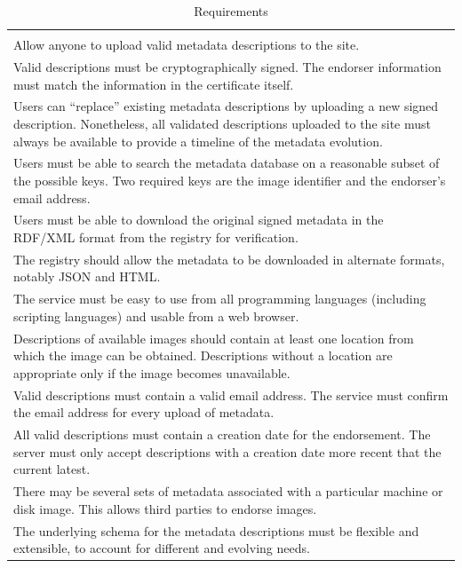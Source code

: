 \begin{table}
\caption{Requirements}
\label{tab:requirements}
\begin{center}
\begin{tabular}{p{}}
\hline\hline

\\ Allow anyone to upload valid metadata descriptions to the site.

\\ Valid descriptions must be cryptographically signed.  The endorser
information must match the information in the certificate itself.

\\ Users can ``replace'' existing metadata descriptions by
  uploading a new signed description.  Nonetheless, all validated
  descriptions uploaded to the site must always be available to
  provide a timeline of the metadata evolution.

\\ Users must be able to search the metadata database on a
  reasonable subset of the possible keys.  Two required keys are the
  image identifier and the endorser's email address.

\\ Users must be able to download the original signed metadata in
  the RDF/XML format from the registry for verification.

\\ The registry should allow the metadata to be downloaded in
  alternate formats, notably JSON and HTML.

\\ The service must be easy to use from all programming languages
  (including scripting languages) and usable from a web browser.


\\
  Descriptions of available images should contain at least one
  location from which the image can be obtained.  Descriptions without
  a location are appropriate only if the image becomes unavailable.

\\ Valid descriptions must contain a valid email address.  The
  service must confirm the email address for every upload of metadata.

\\ All valid descriptions must contain a creation date for the
  endorsement.  The server must only accept descriptions with a
  creation date more recent that the current latest.

\\ There may be several sets of metadata associated with a
  particular machine or disk image. This allows third parties to
  endorse images.

\\ The underlying schema for the metadata descriptions must be
  flexible and extensible, to account for different and evolving
  needs.

\\
\hline\hline
\end{tabular}
\end{center}
\end{table}
